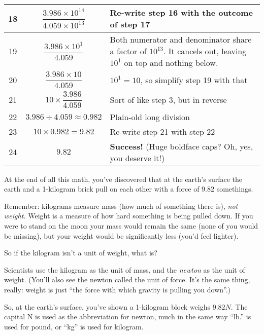 \documentclass[10pt,letterpaper]{report}
\begin{document}
\begin{longtable}{| c | p{} | p{} |}
  \hline
  18 & \[\frac{3.986 \times 10^{14}}{4.059 \times 10^{13}} \] &
  Re-write step 16 with the outcome of step 17 \\
  \hline
  \rowcolor[gray]{0.95} 19 & \[\frac{3.986 \times 10^1}{4.059}\] & Both numerator and
  denominator share a factor of $10^{13}$.  It cancels out, leaving
  $10^1$ on top and nothing below. \\
  \hline
  20 & \[\frac{3.986 \times 10}{4.059}\] & $10^1 = 10$, so simplify
  step 19 with that \\
  \hline
  \rowcolor[gray]{0.95} 21 & \[10 \times \frac{3.986}{4.059}\] & Sort of like step 3, but in
  reverse \\
  \hline
  22 & \[3.986 \div 4.059 \approx 0.982\] & Plain-old long division \\
  \hline
  \rowcolor[gray]{0.95} 23 & \[10 \times 0.982 = 9.82 \] & Re-write step 21 with step 22 \\
  \hline
  24 & \[9.82\] & {\Huge{\textbf{Success!}}} (Huge boldface caps?  Oh, yes,
  you deserve it!) \\
  \hline   
\end{longtable}

At the end of all this math, you've discovered that at the earth's
surface the earth and a 1-kilogram brick pull on each other with a
force of $9.82$ somethings.

Remember: kilograms measure mass (how much of something there is),
\textit{not weight.}  Weight is a measure of how hard something is
being pulled down.  If you were to stand on the moon your mass would
remain the same (none of you would be missing), but your weight would
be significantly less (you'd feel lighter).

So if the kilogram isn't a unit of weight, what is?

Scientists use the kilogram as the unit of mass, and the
\textit{newton} as the unit of weight.  (You'll also see the newton
called the unit of force.  It's the same thing, really: weight is just
``the force with which gravity is pulling you down''.)

So, at the earth's surface, you've shown a 1-kilogram block weighs
$9.82N$.  The capital N is used as the abbreviation for newton, much
in the same way ``lb.'' is used for pound, or ``kg'' is used for kilogram.
\end{document}
